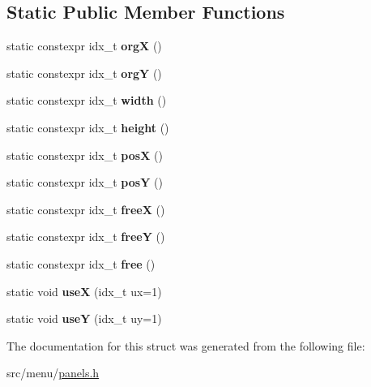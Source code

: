 \subsection*{Static Public Member Functions}
\begin{DoxyCompactItemize}
\item 
\mbox{\label{structStaticPanel_a212fd5e5bcdcd315954c142444fe58cd}} 
static constexpr idx\+\_\+t {\bfseries orgX} ()
\item 
\mbox{\label{structStaticPanel_af02d741f125c68e62f4136d113d1d509}} 
static constexpr idx\+\_\+t {\bfseries orgY} ()
\item 
\mbox{\label{structStaticPanel_a282e4e37cb469aa22c941ae601814dfc}} 
static constexpr idx\+\_\+t {\bfseries width} ()
\item 
\mbox{\label{structStaticPanel_a25776cf952e42e10edb36235744d1326}} 
static constexpr idx\+\_\+t {\bfseries height} ()
\item 
\mbox{\label{structStaticPanel_a5f81c3d0f56d0cd0c898cccd7df0af5d}} 
static constexpr idx\+\_\+t {\bfseries posX} ()
\item 
\mbox{\label{structStaticPanel_a9ab23a0b5f4350ca53442bfe18abb83a}} 
static constexpr idx\+\_\+t {\bfseries posY} ()
\item 
\mbox{\label{structStaticPanel_a5f061e3f28cf7ef9b243d010d61f64fe}} 
static constexpr idx\+\_\+t {\bfseries freeX} ()
\item 
\mbox{\label{structStaticPanel_a3c80c3856c529db7e75985a0dc256aba}} 
static constexpr idx\+\_\+t {\bfseries freeY} ()
\item 
\mbox{\label{structStaticPanel_ab079b6885119d57fa9b19fde200f6d08}} 
static constexpr idx\+\_\+t {\bfseries free} ()
\item 
\mbox{\label{structStaticPanel_a543575d0480cce8c0e3e34fbdff5c6b8}} 
static void {\bfseries useX} (idx\+\_\+t ux=1)
\item 
\mbox{\label{structStaticPanel_aa74dc84981d0ae6f1e5c6a8892b5eea0}} 
static void {\bfseries useY} (idx\+\_\+t uy=1)
\end{DoxyCompactItemize}


The documentation for this struct was generated from the following file\+:\begin{DoxyCompactItemize}
\item 
src/menu/\hyperlink{panels_8h}{panels.\+h}\end{DoxyCompactItemize}
